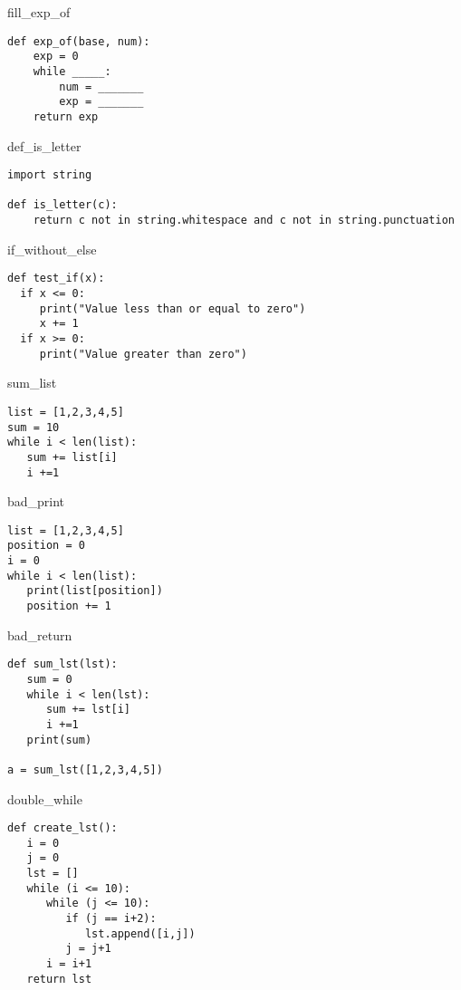 \begin{chunk}{fill_exp_of}
\begin{lstlisting}
def exp_of(base, num):
    exp = 0
    while _____:
        num = _______
        exp = _______
    return exp
\end{lstlisting}
\end{chunk}

\begin{chunk}{def_is_letter}
\begin{lstlisting}
import string

def is_letter(c):
    return c not in string.whitespace and c not in string.punctuation

\end{lstlisting}
\end{chunk}

\begin{chunk}{if_without_else}
  \begin{lstlisting}
def test_if(x):
  if x <= 0:
     print("Value less than or equal to zero")
     x += 1
  if x >= 0:
     print("Value greater than zero")
  \end{lstlisting}
\end{chunk}


\begin{chunk}{sum_list}
  \begin{lstlisting}
list = [1,2,3,4,5]
sum = 10
while i < len(list):
   sum += list[i]
   i +=1
  \end{lstlisting}
\end{chunk}


\begin{chunk}{bad_print}
  \begin{lstlisting}
list = [1,2,3,4,5]
position = 0
i = 0
while i < len(list):
   print(list[position])
   position += 1
  \end{lstlisting}
\end{chunk}

\begin{chunk}{bad_return}
  \begin{lstlisting}
def sum_lst(lst):
   sum = 0
   while i < len(lst):
      sum += lst[i]
      i +=1
   print(sum)

a = sum_lst([1,2,3,4,5])
  \end{lstlisting}
\end{chunk}

\begin{chunk}{double_while}
   \begin{lstlisting}
def create_lst():
   i = 0
   j = 0
   lst = []
   while (i <= 10):
      while (j <= 10):
         if (j == i+2):
            lst.append([i,j])
         j = j+1
      i = i+1
   return lst
  \end{lstlisting}
\end{chunk}
